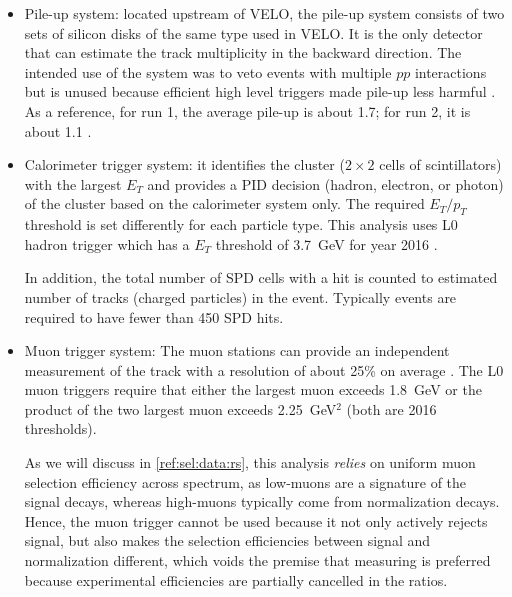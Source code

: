 \begin{itemize}
    \item Pile-up system:
        located upstream of VELO, the pile-up system consists of two sets of
        silicon disks of the same type used in VELO.
        It is the only detector that can estimate the track multiplicity
        in the backward direction.
        The intended use of the system was to veto events with multiple $pp$
        interactions but is unused because efficient high level triggers
        made pile-up less harmful \cite{Oggero:1635658}.
        As a reference, for run 1, the average pile-up is about 1.7;
        for run 2, it is about 1.1
        \cite{d_Argent_2017}.

    \item Calorimeter trigger system:
        it identifies the cluster
        ($2 \times 2$ cells of scintillators) with the largest
        $E_T$ and provides a PID decision (hadron, electron, or photon) of the
        cluster based on the calorimeter system only.
        The required $E_T / p_T$ threshold is set differently
        for each particle type.
        This analysis uses L0 hadron trigger which has a $E_T$ threshold
        of 3.7~GeV for year 2016 \cite{LHCb-DP-2019-001}.

        In addition, the total number of SPD cells with a hit is counted to
        estimated number of tracks (charged particles) in the event.
        Typically events are required to have fewer than 450 SPD hits.

    \item Muon trigger system:
        The muon stations can provide an independent measurement of the track
        \pt with a resolution of about 25\% on average
        \cite{LHCb-DP-2019-001}.
        The L0 muon triggers require that either the largest muon \pt exceeds
        1.8~GeV or the product of the two largest muon \pt exceeds 2.25~GeV$^2$
        (both are 2016 thresholds).

        As we will discuss in \cref{ref:sel:data:rs},
        this analysis \emph{relies} on uniform muon selection efficiency across
        \pt spectrum,
        as low-\pt muons are a signature of the signal decays,
        whereas high-\pt muons typically come from normalization decays.
        Hence, the muon trigger cannot be used because it not only actively
        rejects signal, but also makes the selection efficiencies between signal
        and normalization different,
        which voids the premise that measuring \RDX is preferred because
        experimental efficiencies are partially cancelled in the ratios.
\end{itemize}

